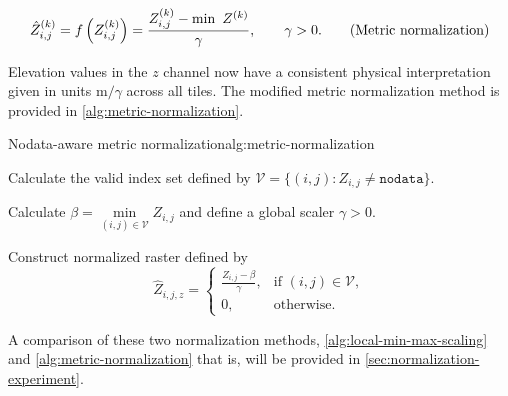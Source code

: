 \begin{equation*}
  \hat{Z}_{i,j}^{(k)}
  =
  f\left(Z_{i,j}^{(k)}\right)
  =
  \frac{%
    Z_{i,j}^{(k)} - \min~Z^{(k)}
  }{%
    \gamma
  },%
  \hspace{2em} \gamma > 0.
  \tag{Metric normalization} %
  \label{test}
\end{equation*}

Elevation values in the $z$ channel now have a consistent physical interpretation given in units $\si{\meter} / \gamma$ across all tiles.
The modified metric normalization method is provided in \cref{alg:metric-normalization}.

\begin{algorithm}{Nodata-aware metric normalization}{alg:metric-normalization}
  \item Calculate the valid index set defined by $\mathcal{V} = \{(i, j): Z_{i,j} \neq \texttt{nodata}\}$.
  \item Calculate $\beta = \underset{(i,j) \in \mathcal{V}}{\min} Z_{i,j}$ and define a global scaler $\gamma > 0$.
  \item Construct normalized raster defined by
    \begin{equation*}
        \hat{Z}_{i,j,z} = \begin{cases}
          \frac{Z_{i,j} - \beta}{\gamma}, & \text{if } (i,j) \in \mathcal{V}, \\
          0, & \text{otherwise.}
        \end{cases}
    \end{equation*}
\end{algorithm}

A comparison of these two normalization methods, \cref{alg:local-min-max-scaling} and \cref{alg:metric-normalization} that is, will be provided in \cref{sec:normalization-experiment}.


